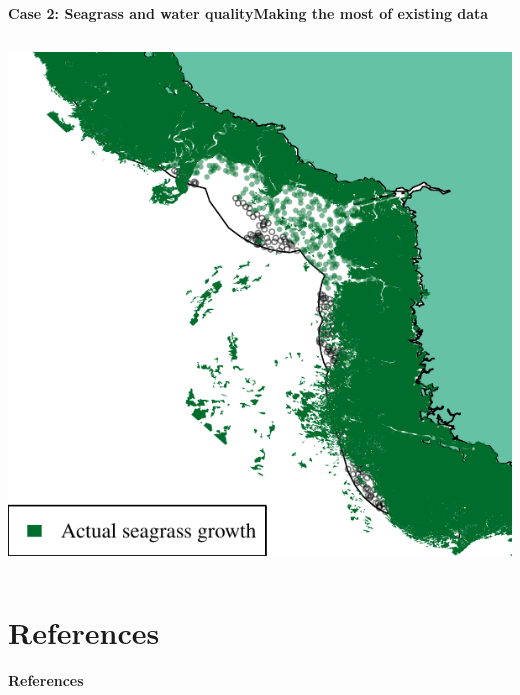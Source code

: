 \documentclass[serif]{beamer}\usepackage[]{graphicx}\usepackage[]{color}
\makeatletter
\def\maxwidth{ %
  \ifdim\Gin@nat@width>\linewidth
    \linewidth
  \else
    \Gin@nat@width
  \fi
}
\newenvironment{knitrout}{}{} %
\makeatother
\begin{document}
\begin{frame}{\textbf{Case 2: Seagrass and water quality}}{\textbf{Making the most of existing data}}
\begin{columns}[T]
\begin{column}{0.45\textwidth}
\begin{knitrout}
{\centering \includegraphics[width=\maxwidth]{fig//docfail2} 

}



\end{knitrout}
\end{column}
\end{columns}
\end{frame}

\section{References}
\begin{frame}[allowframebreaks,t]{\textbf{References}}
\tiny
{}


\end{frame}
\end{document}
